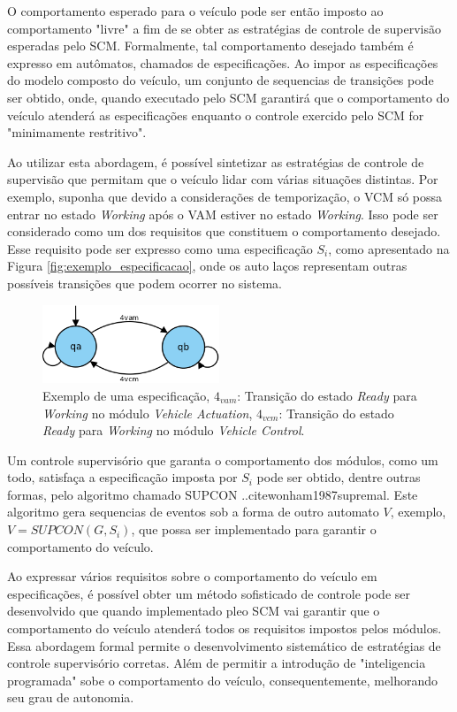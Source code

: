 \documentclass[conference]{IEEEtran}
\begin{document}
O comportamento esperado para o veículo pode ser então imposto ao comportamento "livre" a fim de se obter as estratégias de controle de supervisão esperadas pelo SCM. Formalmente, tal comportamento desejado também é expresso em autômatos, chamados de especificações. Ao impor as especificações do modelo composto do veículo, um conjunto de sequencias de transições pode ser obtido, onde, quando executado pelo SCM garantirá que o comportamento do veículo atenderá as especificações enquanto o controle exercido pelo SCM for "minimamente restritivo".

Ao utilizar esta abordagem, é possível sintetizar as estratégias de controle de supervisão que permitam que o veículo lidar com várias situações distintas. Por exemplo, suponha que devido a considerações de temporização, o VCM só possa entrar no estado \textit{Working} após o VAM estiver no estado \textit{Working}. Isso pode ser considerado como um dos requisitos que constituem o comportamento desejado. Esse requisito pode ser expresso como uma especificação $S_{i}$, como apresentado na Figura \ref{fig:exemplo_especificacao}, onde os auto laços representam outras possíveis transições que podem ocorrer no sistema.

\begin{figure}[H]
	\centering
	\includegraphics[width=200px,keepaspectratio]{files/VILMA_TRANSITION_EXAMPLE}
	\caption{Exemplo de uma especificação, $4_{vam}$: Transição do estado \textit{Ready} para \textit{Working} no módulo \textit{Vehicle Actuation}, $4_{vcm}$: Transição do estado \textit{Ready} para \textit{Working} no módulo \textit{Vehicle Control}.}
	\label{fig:VILMA_TRANSITION_EXAMPLE}
\end{figure}


Um controle supervisório que garanta o comportamento dos módulos, como um todo, satisfaça a especificação imposta por $S_{i}$ pode ser obtido, dentre outras formas, pelo algoritmo chamado SUPCON ..cite{wonham1987supremal}. Este algoritmo gera sequencias de eventos sob a forma de outro automato $V$, exemplo, $ V = SUPCON(G,S_{i})$, que possa ser implementado para garantir o comportamento do veículo.

Ao expressar vários requisitos sobre o comportamento do veículo em especificações, é possível obter um método sofisticado de controle pode ser desenvolvido que quando implementado pleo SCM vai garantir que o comportamento do veículo atenderá todos os requisitos impostos pelos módulos. Essa abordagem formal permite o desenvolvimento sistemático de estratégias de controle supervisório corretas. Além de permitir a introdução de "inteligencia programada" sobe o comportamento do veículo, consequentemente, melhorando seu grau de autonomia.
\end{document}
